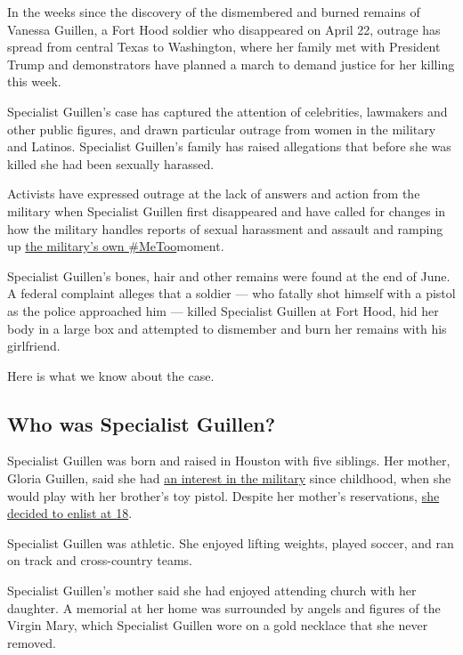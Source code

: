 In the weeks since the discovery of the dismembered and burned remains
of Vanessa Guillen, a Fort Hood soldier who disappeared on April 22,
outrage has spread from central Texas to Washington, where her family
met with President Trump and demonstrators have planned a march to
demand justice for her killing this week.

Specialist Guillen's case has captured the attention of celebrities,
lawmakers and other public figures, and drawn particular outrage from
women in the military and Latinos. Specialist Guillen's family has
raised allegations that before she was killed she had been sexually
harassed.

Activists have expressed outrage at the lack of answers and action from
the military when Specialist Guillen first disappeared and have called
for changes in how the military handles reports of sexual harassment and
assault and ramping up
\href{https://www.nytimes.com/2020/07/11/us/politics/military-women-metoo-fort-hood.html}{the
military's own \#MeToo}moment.

Specialist Guillen's bones, hair and other remains were found at the end
of June. A federal complaint alleges that a soldier --- who fatally shot
himself with a pistol as the police approached him --- killed Specialist
Guillen at Fort Hood, hid her body in a large box and attempted to
dismember and burn her remains with his girlfriend.

Here is what we know about the case.

\hypertarget{who-was-specialist-guillen}{%
\subsection{Who was Specialist
Guillen?}\label{who-was-specialist-guillen}}

Specialist Guillen was born and raised in Houston with five siblings.
Her mother, Gloria Guillen, said she had
\href{https://www.nytimes.com/2020/06/19/us/vanessa-guillen-fort-hood-disappearance.html}{an
interest in the military} since childhood, when she would play with her
brother's toy pistol. Despite her mother's reservations,
\href{https://www.nytimes.com/2020/07/06/us/fort-hood-soldier-vanessa-guillen-remains-found.html}{she
decided to enlist at 18}.

Specialist Guillen was athletic. She enjoyed lifting weights, played
soccer, and ran on track and cross-country teams.

Specialist Guillen's mother said she had enjoyed attending church with
her daughter. A memorial at her home was surrounded by angels and
figures of the Virgin Mary, which Specialist Guillen wore on a gold
necklace that she never removed.

